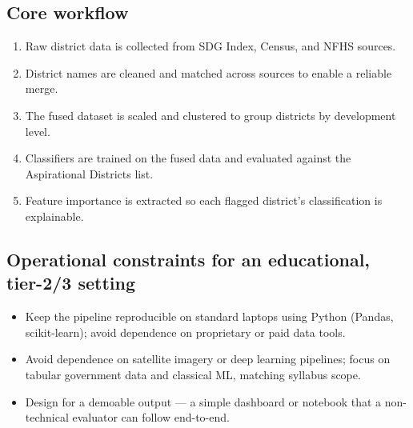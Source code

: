 \documentclass[11pt,a4paper]{article}
\begin{document}
\subsection{Core workflow}
\begin{enumerate}[leftmargin=0.7cm]
    \item Raw district data is collected from SDG Index, Census, and NFHS sources.
    \item District names are cleaned and matched across sources to enable a reliable merge.
    \item The fused dataset is scaled and clustered to group districts by development level.
    \item Classifiers are trained on the fused data and evaluated against the Aspirational Districts list.
    \item Feature importance is extracted so each flagged district's classification is explainable.
\end{enumerate}

\subsection{Operational constraints for an educational, tier-2/3 setting}
\begin{itemize}[leftmargin=0.7cm]
    \item Keep the pipeline reproducible on standard laptops using Python (Pandas, scikit-learn); avoid dependence on proprietary or paid data tools.
    \item Avoid dependence on satellite imagery or deep learning pipelines; focus on tabular government data and classical ML, matching syllabus scope.
    \item Design for a demoable output — a simple dashboard or notebook that a non-technical evaluator can follow end-to-end.
\end{itemize}
\end{document}
